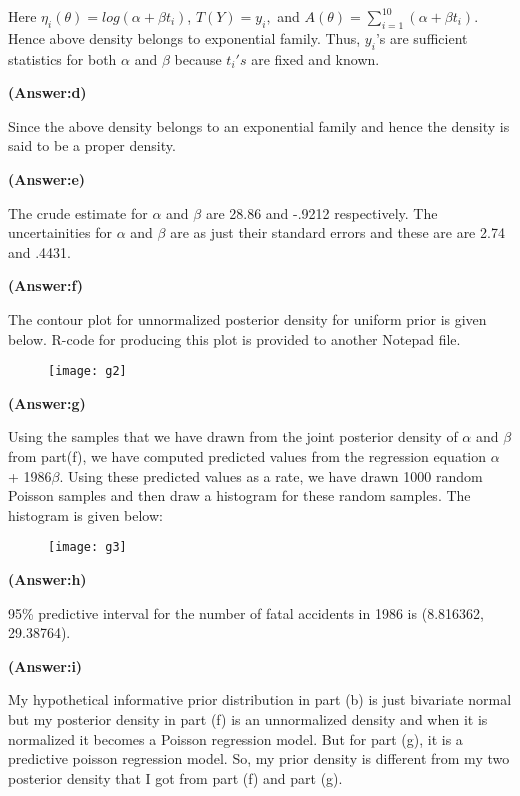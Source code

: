 \documentclass[10pt]{article}
\begin{document}
Here $\eta_{i}(\theta)=log(\alpha +\beta t_{i})$, $T(Y)=y_{i},$ and $A(\theta)=\sum_{i=1}^{10}(\alpha+\beta t_{i}).$ Hence above density belongs to exponential family. Thus, $y_{i}$'s are sufficient statistics for both $\alpha$ and $\beta$ because $t_{i}'s$ are fixed and known.
\begin{center}
\textbf{(Answer:d)}
\end{center}
Since the above density belongs to an exponential family and hence the density is said to be a proper density.
\begin{center}
\textbf{(Answer:e)}
\end{center}
The crude estimate for $\alpha$ and $\beta$ are 28.86 and -.9212 respectively. The uncertainities for $\alpha$ and $\beta$ are as just their standard errors and these are are 2.74 and .4431.
\begin{center}
\textbf{(Answer:f)}
\end{center}
The contour plot for unnormalized posterior density for uniform prior is given below. R-code for producing this plot is provided to another Notepad file.
\begin{figure}[h]
\begin{center}
\texttt{[image: g2]}
\end{center}
\end{figure}
\begin{center}
\textbf{(Answer:g)}
\end{center}
Using the samples that we have drawn from the joint posterior density of $\alpha$ and $\beta$ from part(f), we have computed predicted values from the regression equation $\alpha$ + 1986$\beta$. Using these predicted values as a rate, we have drawn 1000 random Poisson samples and then draw a histogram for these random samples. The histogram is given below:
\begin{figure}[h]
\begin{center}
\texttt{[image: g3]}
\end{center}
\end{figure}
\begin{center}
\textbf{(Answer:h)}
\end{center}
95\% predictive interval for the number of fatal accidents in 1986 is (8.816362, 29.38764).
\begin{center}
\textbf{(Answer:i)}
\end{center}
My hypothetical informative prior distribution in part (b) is just bivariate normal but my posterior density in part (f) is an unnormalized density and when it is normalized it becomes a Poisson regression model. But for part (g), it is a predictive poisson regression model. So, my prior density is different from my two posterior density that I got from part (f) and part (g).
\end{document}

